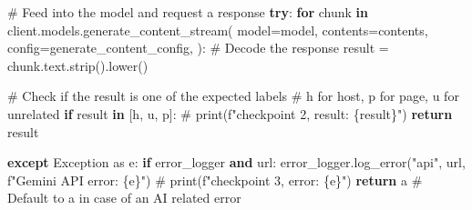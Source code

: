 \documentclass[
  titlepage]{article}
\newenvironment{Shaded}{\begin{snugshade}}{\end{snugshade}}
\newcommand{\CommentTok}[1]{\textcolor[rgb]{0.37,0.37,0.37}{#1}}
\newcommand{\ControlFlowTok}[1]{\textcolor[rgb]{0.00,0.23,0.31}{\textbf{#1}}}
\newcommand{\ImportTok}[1]{\textcolor[rgb]{0.00,0.46,0.62}{#1}}
\newcommand{\KeywordTok}[1]{\textcolor[rgb]{0.00,0.23,0.31}{\textbf{#1}}}
\newcommand{\NormalTok}[1]{\textcolor[rgb]{0.00,0.23,0.31}{#1}}
\newcommand{\OperatorTok}[1]{\textcolor[rgb]{0.37,0.37,0.37}{#1}}
\newcommand{\PreprocessorTok}[1]{\textcolor[rgb]{0.68,0.00,0.00}{#1}}
\newcommand{\SpecialCharTok}[1]{\textcolor[rgb]{0.37,0.37,0.37}{#1}}
\newcommand{\SpecialStringTok}[1]{\textcolor[rgb]{0.13,0.47,0.30}{#1}}
\newcommand{\StringTok}[1]{\textcolor[rgb]{0.13,0.47,0.30}{#1}}
\begin{document}
\begin{Shaded}
\begin{Highlighting}[]
    \CommentTok{\# Feed into the model and request a response}
    \ControlFlowTok{try}\NormalTok{:}
        \ControlFlowTok{for}\NormalTok{ chunk }\KeywordTok{in}\NormalTok{ client.models.generate\_content\_stream(}
\NormalTok{            model}\OperatorTok{=}\NormalTok{model,}
\NormalTok{            contents}\OperatorTok{=}\NormalTok{contents,}
\NormalTok{            config}\OperatorTok{=}\NormalTok{generate\_content\_config,}
\NormalTok{        ):}
            \CommentTok{\# Decode the response}
\NormalTok{            result }\OperatorTok{=}\NormalTok{ chunk.text.strip().lower()}

            \CommentTok{\# Check if the result is one of the expected labels}
            \CommentTok{\# h for host, p for page, u for unrelated}
            \ControlFlowTok{if}\NormalTok{ result }\KeywordTok{in}\NormalTok{ [}\StringTok{\textquotesingle{}h\textquotesingle{}}\NormalTok{, }\StringTok{\textquotesingle{}u\textquotesingle{}}\NormalTok{, }\StringTok{\textquotesingle{}p\textquotesingle{}}\NormalTok{]:}
                \CommentTok{\# print(f"checkpoint 2, result: \{result\}")}
                \ControlFlowTok{return}\NormalTok{ result}

    \ControlFlowTok{except} \PreprocessorTok{Exception} \ImportTok{as}\NormalTok{ e:}
        \ControlFlowTok{if}\NormalTok{ error\_logger }\KeywordTok{and}\NormalTok{ url:}
\NormalTok{            error\_logger.log\_error(}\StringTok{"api"}\NormalTok{, url, }\SpecialStringTok{f"Gemini API error: }\SpecialCharTok{\{}\NormalTok{e}\SpecialCharTok{\}}\SpecialStringTok{"}\NormalTok{)}
        \CommentTok{\# print(f"checkpoint 3, error: \{e\}")}
        \ControlFlowTok{return} \StringTok{\textquotesingle{}a\textquotesingle{}}  \CommentTok{\# Default to \textquotesingle{}a\textquotesingle{} in case of an AI related error}
\end{Highlighting}
\end{Shaded}
\end{document}
